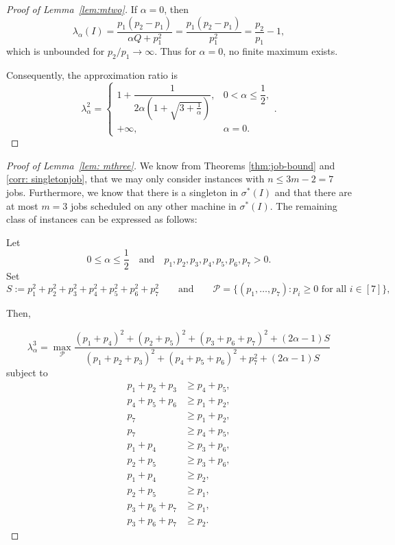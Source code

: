 \documentclass[%
english, titlepage=false %
]{./tum-templates/book/tumbook}
\begin{document}
\begin{proof}[\hypertarget{proof:mtwo}{Proof of Lemma~\ref{lem:mtwo}}]
If \(\alpha=0\), then
\[
\lambda_{\alpha}(I)=\frac{p_1(p_2-p_1)}{\alpha Q +p_1^2}=
\frac{p_1(p_2-p_1)}{p_1^2}
=
\frac{p_2}{p_1}-1,
\]
which is unbounded for \(p_2/p_1\to\infty\). Thus for \(\alpha=0\), no finite maximum exists.

Consequently, the approximation ratio is
\[
\boxed{
\lambda^2_{\alpha}
=
\begin{cases}
1+\dfrac{1}{2\alpha\left(1+\sqrt{3+\frac1\alpha}\right)},
    & 0<\alpha\le \dfrac12,\\[1.2ex]
+\infty,
    & \alpha=0.
\end{cases}
}.
\]
\end{proof}



\label{app:proof-mthree}
\begin{proof}[\hypertarget{proof:mthree}{Proof of Lemma~\ref{lem: mthree}}]
We know from Theorems \ref{thm:job-bound} and \ref{corr: singletonjob}, that we may only consider instances
with $n\le 3m-2=7$ jobs. Furthermore, we know that there is a singleton in $\sigma^*(I)$ and that 
there are at most $m=3$ jobs scheduled on any other machine in $\sigma^*(I)$.
The remaining class of instances can be expressed as follows: 

Let
\[
0\le \alpha\le \frac12 \quad\text{and}\quad
p_1,p_2,p_3,p_4,p_5,p_6,p_7>0.
\]
Set
\[
S:=p_1^2+p_2^2+p_3^2+p_4^2+p_5^2+p_6^2+p_7^2 \qquad\text{and}\qquad \mathcal P
=
\{(p_1,\ldots,p_7):p_i\geq0\text{ for all }i\in[7]\},
\]

Then,

\[
\lambda^3_{\alpha}
=
\max_{\mathcal{P}}
\frac{
(p_1+p_4)^2+(p_2+p_5)^2+(p_3+p_6+p_7)^2+(2\alpha-1)S
}{
(p_1+p_2+p_3)^2+(p_4+p_5+p_6)^2+p_7^2+(2\alpha-1)S
}
\]
subject to
\begin{align}
p_1+p_2+p_3&\ge p_4+p_5,
    \label{con:m3-load-123}\\
p_4+p_5+p_6&\ge p_1+p_2,
    \label{con:m3-load-456}\\
p_7&\ge p_1+p_2,
    \label{con:m3-p7-12}\\
p_7&\ge p_4+p_5,
    \label{con:m3-p7-45}\\
p_1+p_4&\ge p_3+p_6,
    \label{con:m3-p14-36}\\
p_2+p_5&\ge p_3+p_6,
    \label{con:m3-p25-36}\\
p_1+p_4&\ge p_2,
    \label{con:m3-p14-2}\\
p_2+p_5&\ge p_1,
    \label{con:m3-p25-1}\\
p_3+p_6+p_7&\ge p_1,
    \label{con:m3-p367-1}\\
p_3+p_6+p_7&\ge p_2.
    \label{con:m3-p367-2}
\end{align}


\end{proof}
\end{document}
